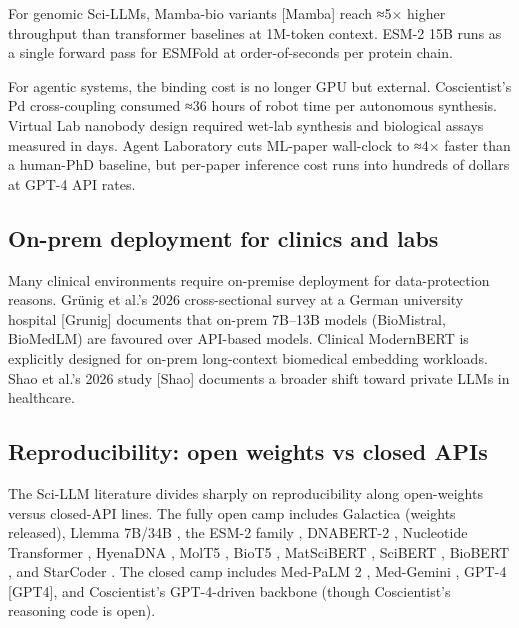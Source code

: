 \documentclass{article}
\begin{document}
For genomic Sci-LLMs, Mamba-bio variants {[}Mamba{]} reach ≈5× higher throughput than transformer baselines at 1M-token context. ESM-2 15B runs as a single forward pass for ESMFold at order-of-seconds per protein chain.

For agentic systems, the binding cost is no longer GPU but external. Coscientist's Pd cross-coupling \cite{boiko2023nature6242023} consumed ≈36 hours of robot time per autonomous synthesis. Virtual Lab nanobody design \cite{swanson2024thevirtuallabaiage} required wet-lab synthesis and biological assays measured in days. Agent Laboratory \cite{schmidgall2025agentlaboratoryusi} cuts ML-paper wall-clock to ≈4× faster than a human-PhD baseline, but per-paper inference cost runs into hundreds of dollars at GPT-4 API rates.

\subsection{On-prem deployment for clinics and labs}\label{on-prem-deployment-for-clinics-and-labs}

Many clinical environments require on-premise deployment for data-protection reasons. Grünig et al.'s 2026 cross-sectional survey at a German university hospital {[}Grunig{]} documents that on-prem 7B--13B models (BioMistral, BioMedLM) are favoured over API-based models. Clinical ModernBERT \cite{lee2025arxiv2504039642025} is explicitly designed for on-prem long-context biomedical embedding workloads. Shao et al.'s 2026 study {[}Shao{]} documents a broader shift toward private LLMs in healthcare.

\subsection{Reproducibility: open weights vs closed APIs}\label{reproducibility-open-weights-vs-closed-apis}

The Sci-LLM literature divides sharply on reproducibility along open-weights versus closed-API lines. The fully open camp includes Galactica (weights released), Llemma 7B/34B \cite{azerbayev2023llemmaanopenlangua}, the ESM-2 family \cite{lin2022evolutionaryscalep}, DNABERT-2 \cite{zhou2023arxiv2306150062023}, Nucleotide Transformer \cite{dallatorre2024nucleotidetransfor}, HyenaDNA \cite{nguyen2023hyenadnalongrangeg}, MolT5 \cite{edwards2022emnlp2022}, BioT5 \cite{pei2023emnlp2023}, MatSciBERT \cite{gupta2022matscibertamateria}, SciBERT \cite{beltagy2019arxiv1903106762019}, BioBERT \cite{lee2019bioinformatics2019}, and StarCoder \cite{li2023starcodermaythesou}. The closed camp includes Med-PaLM 2 \cite{singhal2025towardexpertlevelm}, Med-Gemini \cite{yang2024advancingmultimoda}, GPT-4 {[}GPT4{]}, and Coscientist's GPT-4-driven backbone \cite{boiko2023nature6242023} (though Coscientist's reasoning code is open).
\end{document}
